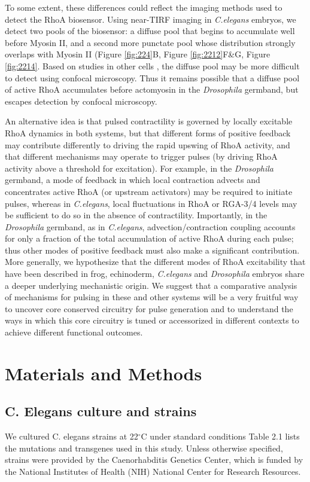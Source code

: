 To some extent, these differences could reflect the imaging methods used to detect the RhoA biosensor.  Using near-TIRF imaging in \textit{C.elegans} embryos, we detect two pools of the biosensor: a diffuse pool that begins to accumulate well before Myosin II, and a second more punctate pool whose distribution strongly overlaps with Myosin II (Figure \ref{fig:224}B, Figure \ref{fig:2212}F\&G, Figure \ref{fig:2214}.  Based on studies in other cells \cite{Weiner:2007cl}, the diffuse pool may be more difficult to detect using confocal microscopy. Thus it remains possible that a diffuse pool of active RhoA accumulates before actomyosin in the \textit{Drosophila} germband, but escapes detection by confocal microscopy.  

An alternative idea is that pulsed contractility is governed by locally excitable RhoA dynamics in both systems, but that different forms of positive feedback may contribute differently to driving the rapid upswing of RhoA activity, and that different mechanisms may operate to trigger pulses (by driving RhoA activity above a threshold for excitation). For example, in the \textit{Drosophila} germband, a mode of feedback in which local contraction advects and concentrates active RhoA (or upstream activators) may be required to initiate pulses, whereas in \textit{C.elegans}, local fluctuations in RhoA or RGA-3/4 levels may be sufficient to do so in the absence of contractility. Importantly, in the \textit{Drosophila} germband, as in \textit{C.elegans}, advection/contraction coupling accounts for only a fraction of the total accumulation of active RhoA during each pulse; thus other modes of positive feedback must also make a significant contribution. 
More generally, we hypothesize that the different modes of RhoA excitability that have been described in frog, echinoderm, \textit{C.elegans} and \textit{Drosophila} embryos share a deeper underlying mechanistic origin. We suggest that a comparative analysis of mechanisms for pulsing in these and other systems will be a very fruitful way to uncover core conserved circuitry for pulse generation and to understand the ways in which this core circuitry is tuned or accessorized in different contexts to achieve different functional outcomes.  




\section{Materials and Methods}
\subsection{C. Elegans culture and strains}
We cultured C. elegans strains at 22$^{\circ}$C under standard conditions \cite{Brenner:1974wn} Table 2.1 lists the mutations and transgenes used in this study. Unless otherwise specified, strains were provided by the Caenorhabditis Genetics Center, which is funded by the National Institutes of Health (NIH) National Center for Research Resources.




